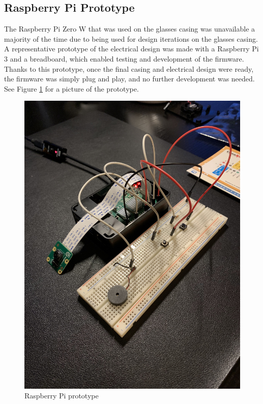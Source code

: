 \documentclass[a4paper,11pt]{article}
\begin{document}
\subsection{Raspberry Pi Prototype}
The Raspberry Pi Zero W that was used on the glasses casing was unavailable a majority of the time due to being used for design iterations on the glasses casing. A representative prototype of the electrical design was made with a Raspberry Pi 3 and a breadboard, which enabled testing and development of the firmware. Thanks to this prototype, once the final casing and electrical design were ready, the firmware was simply plug and play, and no further development was needed. See Figure \ref{fig:rpi_prototype} for a picture of the prototype.

\begin{figure}
\centering
\includegraphics[angle=-90, scale=0.1]{img/rpi_prototype.jpg}
\caption{Raspberry Pi prototype}
\label{fig:rpi_prototype}
\end{figure}
\end{document}
